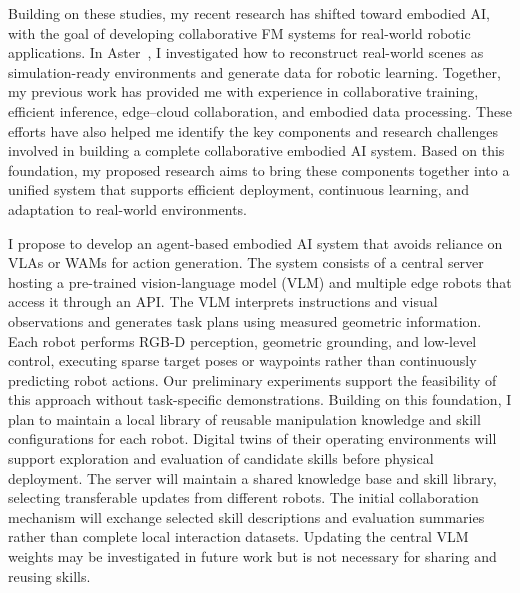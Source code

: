 \documentclass[11pt]{article}
\begin{document}
Building on these studies, my recent research has shifted toward embodied AI, with the goal of developing collaborative FM systems for real-world robotic applications. In Aster~\cite{aster2026}, I investigated how to reconstruct real-world scenes as simulation-ready environments and generate data for robotic learning. Together, my previous work has provided me with experience in collaborative training, efficient inference, edge--cloud collaboration, and embodied data processing. These efforts have also helped me identify the key components and research challenges involved in building a complete collaborative embodied AI system. Based on this foundation, my proposed research aims to bring these components together into a unified system that supports efficient deployment, continuous learning, and adaptation to real-world environments.

I propose to develop an agent-based embodied AI system that avoids reliance on VLAs or WAMs for action generation. The system consists of a central server hosting a pre-trained vision-language model (VLM) and multiple edge robots that access it through an API. The VLM interprets instructions and visual observations and generates task plans using measured geometric information. Each robot performs RGB-D perception, geometric grounding, and low-level control, executing sparse target poses or waypoints rather than continuously predicting robot actions. Our preliminary experiments support the feasibility of this approach without task-specific demonstrations. Building on this foundation, I plan to maintain a local library of reusable manipulation knowledge and skill configurations for each robot. Digital twins of their operating environments will support exploration and evaluation of candidate skills before physical deployment. The server will maintain a shared knowledge base and skill library, selecting transferable updates from different robots. The initial collaboration mechanism will exchange selected skill descriptions and evaluation summaries rather than complete local interaction datasets. Updating the central VLM weights may be investigated in future work but is not necessary for sharing and reusing skills.
\end{document}
